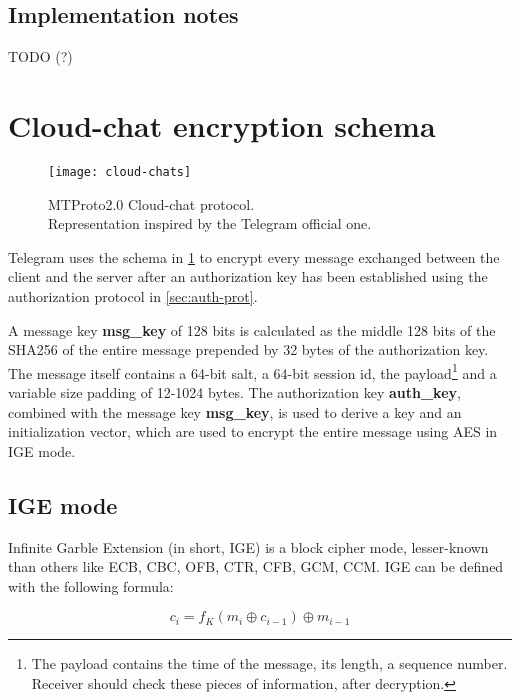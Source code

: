 \subsection{Implementation notes}
TODO (?)








\section{Cloud-chat encryption schema}
\label{sec:cloud-chat}

\begin{figure}[t]
    \centering
    \texttt{[image: cloud-chats]}
    \caption{MTProto2.0 Cloud-chat protocol.\\Representation inspired by the Telegram official one.}
    \label{fig:cloud-chat-protocol}
    \end{figure}

Telegram uses the schema in \cref{fig:cloud-chat-protocol} to encrypt every message exchanged between the client and the server after an authorization key has been established using the authorization protocol in \cref{sec:auth-prot}.

A message key \textbf{msg\_key} of 128 bits is calculated as the middle 128 bits of the SHA256 of the entire message prepended by 32 bytes of the authorization key. The message itself contains a 64-bit salt, a 64-bit session id, the payload\footnote{The payload contains the time of the message, its length, a sequence number. Receiver should check these pieces of information, after decryption.} and a variable size padding of 12-1024 bytes.
The authorization key \textbf{auth\_key}, combined with the message key \textbf{msg\_key}, is used to derive a key and an initialization vector, which are used to encrypt the entire message using AES in IGE mode.

\subsection{IGE mode}
Infinite Garble Extension (in short, IGE) is a block cipher mode, lesser-known than others like ECB, CBC, OFB, CTR, CFB, GCM, CCM.
IGE can be defined with the following formula:

\begin{equation}
c_i = f_K(m_i \oplus c_{i-1}) \oplus m_{i-1}
\end{equation}

